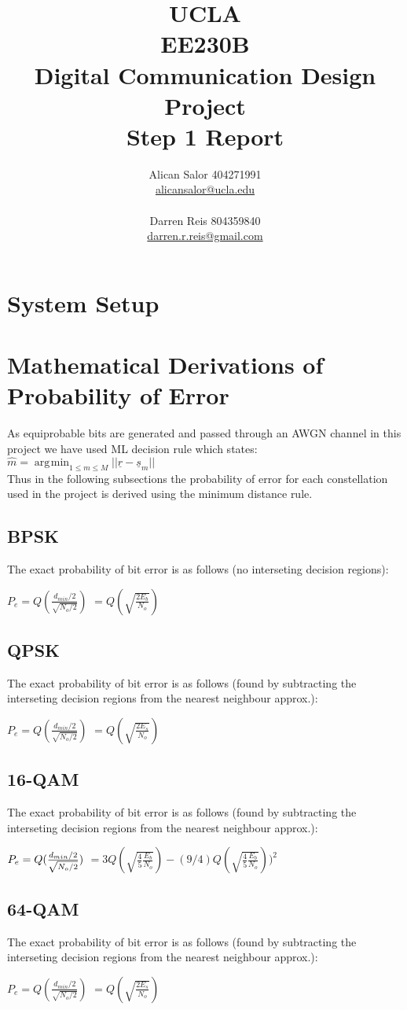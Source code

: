 \documentclass[]{article}
\title{UCLA\\EE230B\\Digital Communication Design Project\\Step 1 Report}
\author{Alican Salor 404271991 \\  \href{mailto:alicansalor@ucla.edu}{alicansalor@ucla.edu} \\ \\
Darren Reis 804359840 \\
\href{mailto:darrer.r.reis@gmail.com}{darren.r.reis@gmail.com} }
\DeclareMathOperator*{\argmin}{\arg\!\min}
\begin{document}
\maketitle

\newpage
\tableofcontents

\newpage


\section{System Setup}

\section{Mathematical Derivations of Probability of Error}

As equiprobable bits are generated and passed through an AWGN channel in this project we have used ML decision rule which states: \\

$\hat{m} = \argmin_{1\leq m \leq M}{||\underline{r} - \underline{s}_m||}$ 
\\

Thus in the following subsections the probability of error for each constellation used in the project is derived using the minimum distance rule.


\subsection{BPSK}
The exact probability of bit error is as follows (no interseting decision regions):

$ P_e = Q(\frac{d_{min}/2}{\sqrt{N_o/2}}) $
$       = Q(\sqrt{\frac{2E_b}{N_o}}) $

\subsection{QPSK}

The exact probability of bit error is as follows (found by subtracting the interseting decision regions from the nearest neighbour approx.):

$ P_e = Q(\frac{d_{min}/2}{\sqrt{N_o/2}}) $
$       = Q(\sqrt{\frac{2E_s}{N_o}}) $ 

\subsection{16-QAM}
The exact probability of bit error is as follows (found by subtracting the interseting decision regions from the nearest neighbour approx.):

$ P_e = Q(\frac{d_{min}/2}{\sqrt{N_o/2}}) \\$
$       = 3Q(\sqrt{\frac{4}{5}\frac{E_b}{N_o}})-(9/4)Q(\sqrt{\frac{4}{5}\frac{E_b}{N_o}}))^2$ 

\subsection{64-QAM}
The exact probability of bit error is as follows (found by subtracting the interseting decision regions from the nearest neighbour approx.):

$ P_e = Q(\frac{d_{min}/2}{\sqrt{N_o/2}}) $
$       = Q(\sqrt{\frac{2E_s}{N_o}}) $ 
\end{document}
